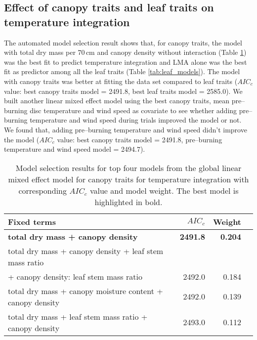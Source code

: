 \documentclass{bmcart}
\begin{document}
\subsection*{Effect of canopy traits and leaf traits on temperature integration}
The automated model selection result shows that, for canopy traits, the model with total dry mass per 70\,cm and canopy density without interaction (Table \ref{tab:canopy_models}) was the best fit to predict temperature integration and \MakeUppercase{lma} alone was the best fit as predictor among all the leaf traits (Table \ref{tab:leaf_models}). The model with canopy traits was better at fitting the data set compared to leaf traits ($AIC_{c}$ value: best canopy traits model = 2491.8, best leaf traits model = 2585.0). We built another linear mixed effect model using the best canopy traits, mean pre--burning disc temperature and wind speed as  covariate to see whether adding pre--burning temperature and wind speed during trials improved the model or not. We found that, adding pre--burning temperature and wind speed didn't improve the model ($AIC_{c}$ value: best canopy traits model = 2491.8, pre--burning temperature and wind speed model = 2494.7).
\begin{table}
  \centering
  \caption{Model selection results for top four models from the global linear
    mixed effect model for canopy traits for temperature integration with
    corresponding $AIC_{c}$ value and model weight. The best model is highlighted in bold.}
  \begin{tabular}{lrrr}
    \toprule
    \textbf{Fixed terms} & \textbf{$AIC_{c}$} & \textbf{Weight}\\
    \midrule
    \textbf{total dry mass + canopy density}    & \textbf{2491.8} &  \textbf{0.204}\\
    total dry mass + canopy density + leaf stem mass ratio \\+ canopy density: leaf stem mass ratio & 2492.0  & 0.184 \\
    total dry mass + canopy moisture content + canopy density   & 2492.0   & 0.139 \\ 
    total dry mass + leaf stem mass ratio + canopy density  & 2493.0 & 0.112  \\
    \bottomrule
  \end{tabular}
  \label{tab:canopy_models}
\end{table}
\end{document}
